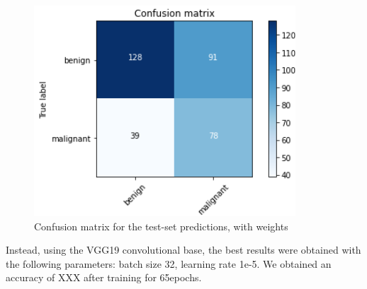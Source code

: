 \documentclass[11pt,a4paper,oneside]{article}
\begin{document}
\begin{figure}[h]
\begin{minipage}[c]{.4\textwidth}
		\includegraphics[width=.9\textwidth]{images/Task 3/VGG16 3.2/With Weights/Conf Matrix}
		\caption{Confusion matrix for the test-set predictions, with weights}
		\label{fig:vgg16_3.2_matrix}
	\end{minipage}%
\end{figure}

Instead, using the VGG19 convolutional base, the best results were obtained with the following parameters: batch size 32, learning rate 1e-5. We obtained an accuracy of XXX after training for 65epochs. 
\end{document}
